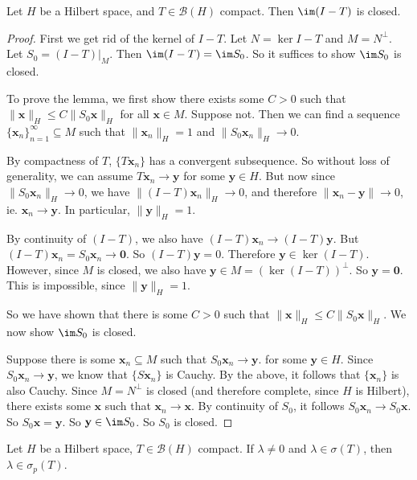 \documentclass[a4paper]{article}
\begin{document}
\begin{lemma}
  Let $H$ be a Hilbert space, and $T \in \mathcal{B}(H)$ compact. Then $\im (I - T)$ is closed.
\end{lemma}

\begin{proof}
  First we get rid of the kernel of $I - T$. Let $N = \ker I - T$ and $M = N^\perp$. Let $S_0 = (I - T)|_{M}$. Then $\im (I - T) = \im S_0$. So it suffices to show $\im S_0$ is closed.

  To prove the lemma, we first show there exists some $C > 0$ such that $\|\mathbf{x}\|_H \leq C \|S_0 \mathbf{x}\|_H$ for all $\mathbf{x} \in M$. Suppose not. Then we can find a sequence $\{\mathbf{x}_n\}_{n = 1}^\infty \subseteq M$ such that $\|\mathbf{x}_n\|_H = 1$ and $\|S_0 \mathbf{x}_n\|_H \to 0$.

  By compactness of $T$, $\{T \mathbf{x}_n\}$ has a convergent subsequence. So without loss of generality, we can assume $T \mathbf{x}_n \to \mathbf{y}$ for some $\mathbf{y} \in H$. But now since $\|S_0 \mathbf{x}_n\|_H \to 0$, we have $\|(I - T) \mathbf{x}_n\|_H \to 0$, and therefore $\|\mathbf{x}_n - \mathbf{y}\| \to 0$, ie. $\mathbf{x}_n \to \mathbf{y}$. In particular, $\|\mathbf{y}\|_H = 1$.

  By continuity of $(I - T)$, we also have $(I - T) \mathbf{x}_n \to (I - T) \mathbf{y}$. But $(I - T) \mathbf{x}_n = S_0 \mathbf{x}_n \to \mathbf{0}$. So $(I - T) \mathbf{y} = 0$. Therefore $\mathbf{y} \in \ker(I - T)$. However, since $M$ is closed, we also have $\mathbf{y} \in M = (\ker (I - T))^\perp$. So $\mathbf{y} = \mathbf{0}$. This is impossible, since $\|\mathbf{y}\|_H = 1$.

  So we have shown that there is some $C > 0$ such that $\|\mathbf{x}\|_H \leq C \|S_0 \mathbf{x}\|_H$. We now show $\im S_0$ is closed.

  Suppose there is some $\mathbf{x}_n \subseteq M$ such that $S_0 \mathbf{x}_n \to \mathbf{y}$. for some $\mathbf{y} \in H$. Since $S_0 \mathbf{x}_n \to \mathbf{y}$, we know that $\{S \mathbf{x}_n\}$ is Cauchy. By the above, it follows that $\{\mathbf{x}_n\}$ is also Cauchy. Since $M = N^\perp$ is closed (and therefore complete, since $H$ is Hilbert), there exists some $\mathbf{x}$ such that $\mathbf{x}_n \to \mathbf{x}$. By continuity of $S_0$, it follows $S_0 \mathbf{x}_n \to S_0 \mathbf{x}$. So $S_0 \mathbf{x} = \mathbf{y}$. So $\mathbf{y} \in \im S_0$. So $S_0$ is closed.
\end{proof}

\begin{prop}
  Let $H$ be a Hilbert space, $T \in \mathcal{B}(H)$ compact. If $\lambda \not= 0$ and $\lambda \in \sigma(T)$, then $\lambda \in \sigma_p(T)$.
\end{prop}
\end{document}
